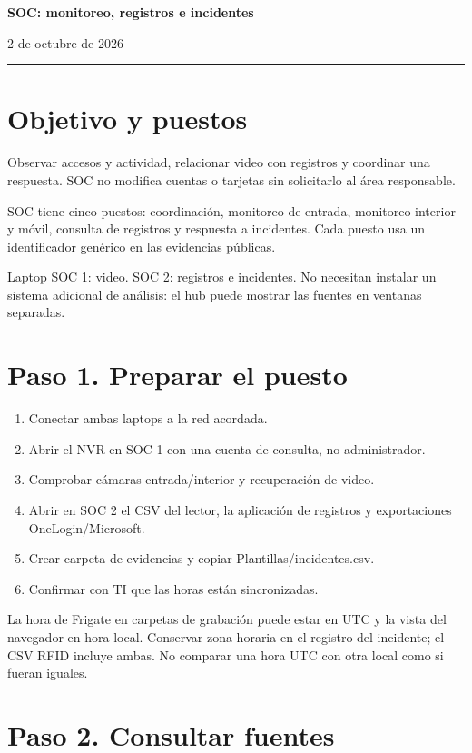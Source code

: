 \documentclass[12pt,a4paper]{article}
\begin{document}
{\LARGE\bfseries SOC: monitoreo, registros e incidentes\par}\vspace{6pt}
2 de octubre de 2026\par\hrule\vspace{10pt}
\section*{Objetivo y puestos}
Observar accesos y actividad, relacionar video con registros y coordinar una respuesta. SOC no modifica cuentas o tarjetas sin solicitarlo al área responsable.\par
SOC tiene cinco puestos: coordinación, monitoreo de entrada, monitoreo interior y móvil, consulta de registros y respuesta a incidentes. Cada puesto usa un identificador genérico en las evidencias públicas.\par
Laptop SOC 1: video. SOC 2: registros e incidentes. No necesitan instalar un sistema adicional de análisis: el hub puede mostrar las fuentes en ventanas separadas.\par
{}\section*{Paso 1. Preparar el puesto}
\begin{enumerate}
\item Conectar ambas laptops a la red acordada.
\item Abrir el NVR en SOC 1 con una cuenta de consulta, no administrador.
\item Comprobar cámaras entrada/interior y recuperación de video.
\item Abrir en SOC 2 el CSV del lector, la aplicación de registros y exportaciones OneLogin/Microsoft.
\item Crear carpeta de evidencias y copiar \textnormal{Plantillas/\allowbreak{}incidentes.csv}.
\item Confirmar con TI que las horas están sincronizadas.
\end{enumerate}
La hora de Frigate en carpetas de grabación puede estar en UTC y la vista del navegador en hora local. Conservar zona horaria en el registro del incidente; el CSV RFID incluye ambas. No comparar una hora UTC con otra local como si fueran iguales.\par
{}\section*{Paso 2. Consultar fuentes}
\end{document}
